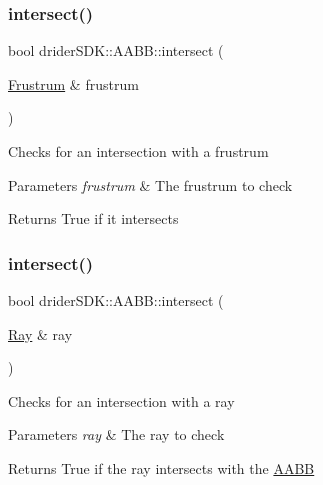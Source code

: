 \subsubsection{\texorpdfstring{intersect()}{intersect()}\hspace{0.1cm}{\footnotesize\ttfamily [4/6]}}
{\footnotesize\ttfamily bool drider\+S\+D\+K\+::\+A\+A\+B\+B\+::intersect (\begin{DoxyParamCaption}\item[{\hyperlink{classdrider_s_d_k_1_1_frustrum}{Frustrum} \&}]{frustrum }\end{DoxyParamCaption})}

Checks for an intersection with a frustrum


\begin{DoxyParams}{Parameters}
{\em frustrum} & The frustrum to check\\
\hline
\end{DoxyParams}
\begin{DoxyReturn}{Returns}
True if it intersects 
\end{DoxyReturn}
\mbox{\label{classdrider_s_d_k_1_1_a_a_b_b_ad52284fbf96cf41b06d23e05b59df235}} 
\subsubsection{\texorpdfstring{intersect()}{intersect()}\hspace{0.1cm}{\footnotesize\ttfamily [5/6]}}
{\footnotesize\ttfamily bool drider\+S\+D\+K\+::\+A\+A\+B\+B\+::intersect (\begin{DoxyParamCaption}\item[{\hyperlink{classdrider_s_d_k_1_1_ray}{Ray} \&}]{ray }\end{DoxyParamCaption})}

Checks for an intersection with a ray


\begin{DoxyParams}{Parameters}
{\em ray} & The ray to check\\
\hline
\end{DoxyParams}
\begin{DoxyReturn}{Returns}
True if the ray intersects with the \hyperlink{classdrider_s_d_k_1_1_a_a_b_b}{A\+A\+BB} 
\end{DoxyReturn}
\mbox{\label{classdrider_s_d_k_1_1_a_a_b_b_a267f402755230b75e2148ea279360593}} 
